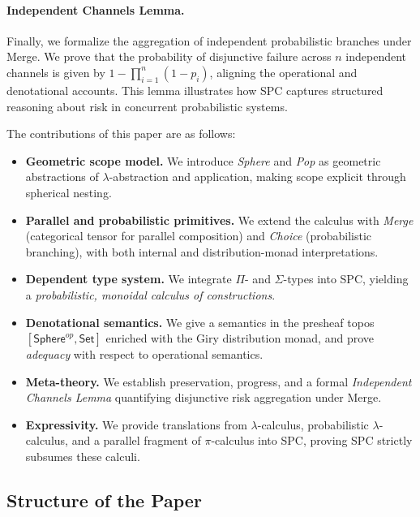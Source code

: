 \documentclass{article}
\begin{document}
\paragraph{Independent Channels Lemma.}
Finally, we formalize the aggregation of independent probabilistic branches
under Merge. We prove that the probability of disjunctive failure across $n$
independent channels is given by $1 - \prod_{i=1}^n(1-p_i)$, aligning the
operational and denotational accounts. This lemma illustrates how SPC captures
structured reasoning about risk in concurrent probabilistic systems.

The contributions of this paper are as follows:

\begin{itemize}
  \item \textbf{Geometric scope model.}
  We introduce \emph{Sphere} and \emph{Pop} as geometric abstractions of
  $\lambda$-abstraction and application, making scope explicit through
  spherical nesting.

  \item \textbf{Parallel and probabilistic primitives.}
  We extend the calculus with \emph{Merge} (categorical tensor for parallel
  composition) and \emph{Choice} (probabilistic branching), with both internal
  and distribution-monad interpretations.

  \item \textbf{Dependent type system.}
  We integrate $\Pi$- and $\Sigma$-types into SPC, yielding a
  \emph{probabilistic, monoidal calculus of constructions}.

  \item \textbf{Denotational semantics.}
  We give a semantics in the presheaf topos $[\mathsf{Sphere}^{op},\mathsf{Set}]$
  enriched with the Giry distribution monad, and prove \emph{adequacy} with
  respect to operational semantics.

  \item \textbf{Meta-theory.}
  We establish preservation, progress, and a formal \emph{Independent Channels Lemma}
  quantifying disjunctive risk aggregation under Merge.

  \item \textbf{Expressivity.}
  We provide translations from $\lambda$-calculus, probabilistic $\lambda$-calculus,
  and a parallel fragment of $\pi$-calculus into SPC, proving SPC strictly subsumes
  these calculi.
\end{itemize}

\subsection{Structure of the Paper}
\end{document}
